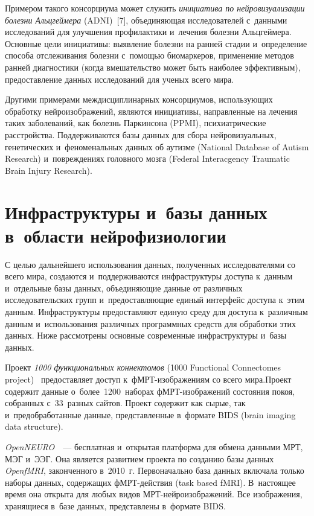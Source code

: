 \begin{multicols}{2}
    Примером такого консорциума может служить \textit{инициатива по 
нейровизуализации болезни Альцгеймера} (ADNI)~[7], объединяющая исследователей с~данными 
исследований для улучшения профилактики и~лечения болезни Альцгеймера. 
Основные цели инициативы: выявление болезни на ранней стадии 
и~определение способа отслеживания болезни с~помощью биомаркеров, 
применение методов ранней диагностики (когда вмешательство может быть 
наиболее эффективным), предостав\-ле\-ние данных исследований для ученых 
всего \mbox{мира}. 
{

}
    
    Другими примерами междисциплинарных консорциумов, 
использующих обработку ней\-ро\-изоб\-ра\-же\-ний, являются инициативы, 
направленные на лечения таких заболеваний, как болезнь Паркинсона (PPMI), 
психиатрические 
расстройства. Поддерживаются базы данных для сбора нейровизуальных, 
генетических и~феноменальных данных об аутизме (National Database of 
Autism Research) и~повреждениях головного мозга (Federal Interacgency 
Traumatic Brain Injury Research).
    
\section{Инфраструктуры и~базы данных в~области 
нейрофизиологии}

    С целью дальнейшего использования данных, полученных 
исследователями со всего мира, создаются и~поддерживаются 
инфраструктуры доступа к~данным и~отдельные базы данных, объеди\-ня\-ющие 
данные от различных исследовательских групп и~пред\-остав\-ля\-ющие единый 
интерфейс доступа к~этим данным. Инфраструктуры пред\-остав\-ля\-ют единую 
среду для доступа к~различным данным и~использования различных 
программных средств для обработки этих данных. Ниже рассмотрены 
основные современные инфраструктуры и~базы данных.

\medskip
    
    Проект \textit{1000 функциональных коннектомов} (1000 Functional 
Connectomes project)~\cite{8-bs} предоставляет доступ  
к~фМРТ-изоб\-ра\-же\-ни\-ям со всего мира.\linebreak Проект содержит данные 
о~более~1200~наборах фМРТ-изображений состояния покоя, собранных 
с~33~разных сайтов. Проект содержит как сырые, так и~пред\-об\-ра\-бо\-тан\-ные 
данные, представленные в~формате BIDS  (brain imaging data structure).

\medskip
    
    \textit{OpenNEURO}~\cite{9-bs}~--- бесплатная и~открытая платформа 
для обмена данными МРТ, МЭГ и~ЭЭГ. Она является развитием проекта по 
созданию базы данных \textit{OpenfMRI}, законченного в~2010~г. 
Первоначально база данных включала только наборы данных, содержащих 
фМРТ-дей\-ст\-вия (task based \mbox{fMRI}). В~настоящее время она открыта для 
любых видов  
МРТ-ней\-ро\-изоб\-ра\-же\-ний. Все изображения, хранящиеся в~базе 
данных, представлены в~формате BIDS.
    

\end{multicols}
